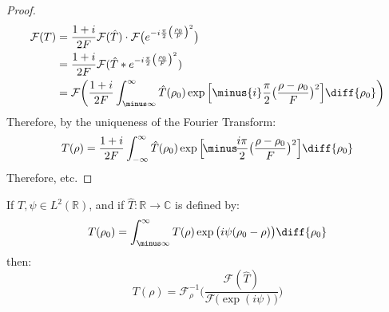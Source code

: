 \begin{proof}
\begin{subequations}
                \begin{align}
                    \mathcal{F}(T)
                    &=\frac{1+i}{2F}\mathcal{F}(\hat{T})
                        \cdot\mathcal{F}
                        \big(e^{-i\frac{\pi}{2}
                        \big(\frac{\rho_0}{F}\big)^2}\big)\\
                    &=\frac{1+i}{2F}\mathcal{F}
                        (\hat{T}*e^{-i\frac{\pi}{2}
                        \big(\frac{\rho_0}{F}\big)^2})\\
                &=\mathcal{F}\bigg(\frac{1+i}{2F}
                    \int_{\minus\infty}^{\infty}\hat{T}(\rho_{0})
                    \exp\Big[\minus{i}\frac{\pi}{2}\big(
                        \frac{\rho-\rho_{0}}{F}\big)^{2}\Big]
                    \diff{\rho_{0}}\bigg)
                \end{align}
            \end{subequations}
            Therefore, by the uniqueness of the Fourier Transform:
            \begin{equation}
                T(\rho)=\frac{1+i}{2F}\int_{-\infty}^{\infty}
                    \hat{T}(\rho_{0})\exp\Big[
                        \!\minus\!\frac{i\pi}{2}
                        \big(\frac{\rho-\rho_{0}}{F}\big)^{2}
                    \Big]\diff{\rho_{0}}
            \end{equation}
            Therefore, etc.
        \end{proof}
        \begin{theorem}
                If $T,\psi\in{L}^{2}(\mathbb{R})$, and if
                $\hat{T}:\mathbb{R}\rightarrow\mathbb{C}$
                is defined by:
                \begin{equation}
                T(\rho_{0})=\int_{\minus\infty}^{\infty}
                    T(\rho)\exp\big(i\psi(\rho_{0}-\rho)\big)
                    \diff{\rho_{0}}
                \end{equation}
                then:
                \begin{equation}
                    T(\rho)=\mathcal{F}^{\minus{1}}_{\rho}\Big(
                        \frac{\mathcal{F}(\hat{T})}
                            {\mathcal{F}\big(\exp(i\psi)\big)}
                        \Big)
                \end{equation}
        \end{theorem}
